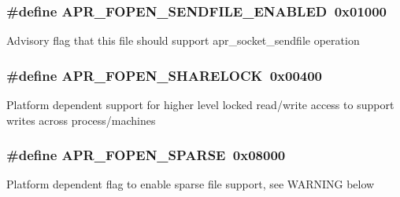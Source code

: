 \subsubsection[{\texorpdfstring{A\+P\+R\+\_\+\+F\+O\+P\+E\+N\+\_\+\+S\+E\+N\+D\+F\+I\+L\+E\+\_\+\+E\+N\+A\+B\+L\+ED}{APR_FOPEN_SENDFILE_ENABLED}}]{\setlength{\rightskip}{0pt plus 5cm}\#define A\+P\+R\+\_\+\+F\+O\+P\+E\+N\+\_\+\+S\+E\+N\+D\+F\+I\+L\+E\+\_\+\+E\+N\+A\+B\+L\+ED~0x01000}\hypertarget{group__apr__file__open__flags_ga60c21e28e4a612d58a874fe2cc71a6e4}{}\label{group__apr__file__open__flags_ga60c21e28e4a612d58a874fe2cc71a6e4}
Advisory flag that this file should support apr\+\_\+socket\+\_\+sendfile operation 
\subsubsection[{\texorpdfstring{A\+P\+R\+\_\+\+F\+O\+P\+E\+N\+\_\+\+S\+H\+A\+R\+E\+L\+O\+CK}{APR_FOPEN_SHARELOCK}}]{\setlength{\rightskip}{0pt plus 5cm}\#define A\+P\+R\+\_\+\+F\+O\+P\+E\+N\+\_\+\+S\+H\+A\+R\+E\+L\+O\+CK~0x00400}\hypertarget{group__apr__file__open__flags_ga426f6e2a8457ab410d99248269059a18}{}\label{group__apr__file__open__flags_ga426f6e2a8457ab410d99248269059a18}
Platform dependent support for higher level locked read/write access to support writes across process/machines 
\subsubsection[{\texorpdfstring{A\+P\+R\+\_\+\+F\+O\+P\+E\+N\+\_\+\+S\+P\+A\+R\+SE}{APR_FOPEN_SPARSE}}]{\setlength{\rightskip}{0pt plus 5cm}\#define A\+P\+R\+\_\+\+F\+O\+P\+E\+N\+\_\+\+S\+P\+A\+R\+SE~0x08000}\hypertarget{group__apr__file__open__flags_ga0d155e9bb7fbf1a5cd4e84b5ede059f4}{}\label{group__apr__file__open__flags_ga0d155e9bb7fbf1a5cd4e84b5ede059f4}
Platform dependent flag to enable sparse file support, see W\+A\+R\+N\+I\+NG below

